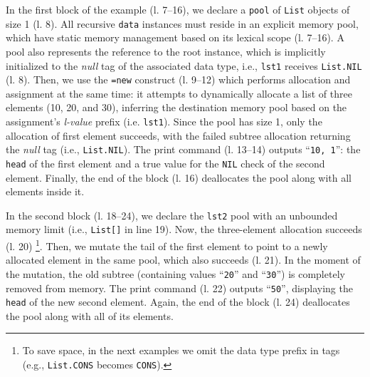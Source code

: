 \documentclass{sig-alternate}
\newcommand{\CEU}{\textsc{C\'{e}u}\xspace}
\newcommand{\code}[1] {{\small{\texttt{#1}}}}
\begin{document}

In the first block of the example (l. 7--16), we declare a \code{pool} of 
\code{List} objects of size 1 (l. 8).
%
All recursive \code{data} instances must reside in an explicit memory pool, 
which have static memory management based on its lexical scope (l. 7--16).
%
A pool also represents the reference to the root instance, which is implicitly 
initialized to the \emph{null} tag of the associated data type, i.e., 
\code{lst1} receives \code{List.NIL} (l. 8).
%
Then, we use the \code{=new} construct (l. 9--12) which performs
allocation and assignment at the same time: it attempts to dynamically allocate 
a list of three elements (10, 20, and 30), inferring the destination memory 
pool based on the assignment's \emph{l-value} prefix (i.e. \code{lst1}).
%
Since the pool has size 1, only the allocation of first element succeeds, with 
the failed subtree allocation returning the \emph{null} tag (i.e., 
\code{List.NIL}).
The print command (l. 13--14) outputs ``\texttt{10, 1}'': the \code{head} of 
the first element and a true value for the \code{NIL} check of the second 
element.
%
Finally, the end of the block (l. 16) deallocates the pool along with all 
elements inside it.

In the second block (l. 18--24), we declare the \code{lst2} pool with an 
unbounded memory limit (i.e., \code{List[]} in line 19).
Now, the three-element allocation succeeds (l. 20)%
\footnote{To save space, in the next examples we omit the data type prefix in 
tags (e.g., \code{List.CONS} becomes \code{CONS}).}.
Then, we mutate the tail of the first element to point to a newly allocated 
element in the same pool, which also succeeds (l. 21).
In the moment of the mutation, the old subtree (containing values  
``\texttt{20}'' and  ``\texttt{30}'') is completely removed from memory.
The print command (l. 22) outputs ``\texttt{50}'', displaying the \code{head}
of the new second element.
%
Again, the end of the block (l. 24) deallocates the pool along with all of 
its elements.
\end{document}
